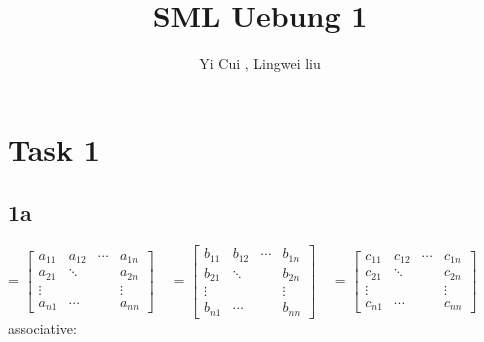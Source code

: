 \documentclass{article}
\title{SML Uebung 1}
\author{Yi Cui , Lingwei liu}
\begin{document}
\maketitle
\newpage
\section* {Task 1}
\subsection*{1a}
=
$
\begin{bmatrix} 
a_{11}&a_{12}&\cdots&a_{1n}\\
a_{21}&\ddots& &a_{2n}\\
\vdots& & &\vdots\\
a_{n1}&\cdots& &a_{nn}
\end{bmatrix} 
\quad
$
=
$
\begin{bmatrix} 
b_{11}&b_{12}&\cdots&b_{1n}\\
b_{21}&\ddots& &b_{2n}\\
\vdots& & &\vdots\\
b_{n1}&\cdots& &b_{nn}
\end{bmatrix} 
\quad
$
=
$
\begin{bmatrix} 
c_{11}&c_{12}&\cdots&c_{1n}\\
c_{21}&\ddots& &c_{2n}\\
\vdots& & &\vdots\\
c_{n1}&\cdots& &c_{nn}
\end{bmatrix} 
\quad
$
\\[15pt]
associative:
\end{document}

